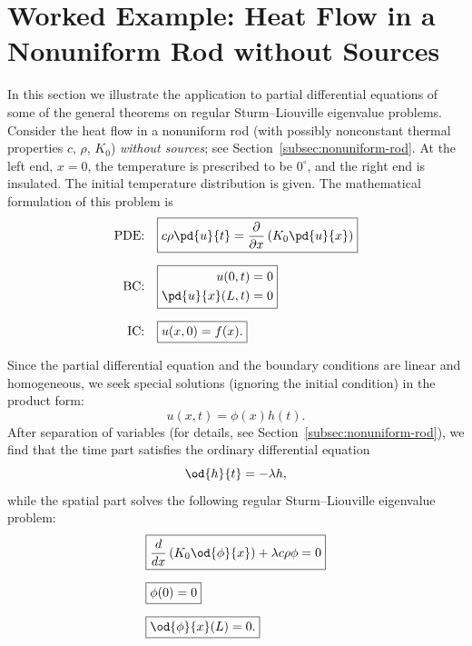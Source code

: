 \section{Worked Example: Heat Flow in a Nonuniform Rod without Sources}
\label{sec:sl-heat-nonuniform}

In this section we illustrate the application to partial differential equations of some of the general theorems on regular Sturm--Liouville eigenvalue problems.  Consider the heat flow in a nonuniform rod (with possibly nonconstant thermal properties $c$, $\rho$, $K_0$) \textit{without sources}; see Section~\ref{subsec:nonuniform-rod}.  At the left end, $x = 0$, the temperature is prescribed to be $0^\circ$, and the right end is insulated.  The initial temperature distribution is given.  The mathematical formulation of this problem is
\begin{align}
\label{eq:heat-nonuniform-pde}
\text{PDE:}\quad & \boxed{c\rho\pd{u}{t} = \frac{\partial}{\partial x}\left(K_0\pd{u}{x}\right)} \\[6pt]
\label{eq:heat-nonuniform-bc}
\text{BC:}\quad & \boxed{\begin{aligned} u(0,t) &= 0 \\ \pd{u}{x}(L,t) &= 0 \end{aligned}} \\[6pt]
\label{eq:heat-nonuniform-ic}
\text{IC:}\quad & \boxed{u(x,0) = f(x).}
\end{align}

Since the partial differential equation and the boundary conditions are linear and homogeneous, we seek special solutions (ignoring the initial condition) in the product form:
\begin{equation}
\label{eq:product-uxt}
u(x,t) = \phi(x)h(t).
\end{equation}
After separation of variables (for details, see Section~\ref{subsec:nonuniform-rod}), we find that the time part satisfies the ordinary differential equation
\begin{equation}
\label{eq:time-part}
\od{h}{t} = -\lambda h,
\end{equation}
while the spatial part solves the following regular Sturm--Liouville eigenvalue problem:
\begin{align}
\label{eq:spatial-sl-heat}
& \boxed{\frac{d}{d x}\left(K_0\od{\phi}{x}\right) + \lambda c\rho\phi = 0} \\[6pt]
\label{eq:spatial-bc1}
& \boxed{\phi(0) = 0} \\[6pt]
\label{eq:spatial-bc2}
& \boxed{\od{\phi}{x}(L) = 0.}
\end{align}

